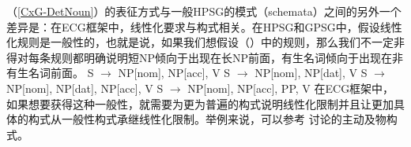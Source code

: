 （\ref{CxG-DetNoun}）的表征方式与一般HPSG的模式（schemata）之间的另外一个差异是：在ECG框架中，线性化要求与构式相关。在HPSG\indexhpsg 和GPSG\indexgpsgc 中，假设线性化规则是一般性的，也就是说，如果我们想假设（）中的规则，那么我们不一定非得对每条规则都明确说明短NP倾向于出现在长NP前面，有生名词倾向于出现在非有生名词前面。
\eal
\ex S $\to$ NP[nom], NP[acc], V
\ex S $\to$ NP[nom], NP[dat], V
\ex S $\to$ NP[nom], NP[dat], NP[acc], V
\ex S $\to$ NP[nom], NP[acc], PP, V
\zl
在ECG框架中，如果想要获得这种一般性，就需要为更为普遍的构式说明线性化限制并且让更加具体的构式从一般性构式承继线性化限制。举例来说，可以参考 \citet[]{BC2005a}讨论的主动及物构式。

